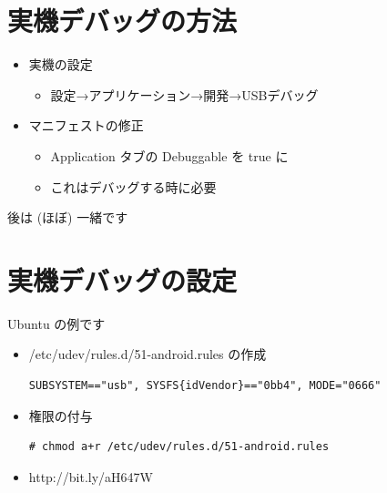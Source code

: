\documentclass[slide,papersize]{jsarticle}
\begin{document}
\section*{実機デバッグの方法}
\bigskip
\begin{itemize}
\item 実機の設定
 \begin{itemize}
 \item {\footnotesize 設定→アプリケーション→開発→USBデバッグ}
 \end{itemize}
\bigskip
\item マニフェストの修正
 \begin{itemize}
 \item {\footnotesize Application タブの Debuggable を true に}
 \item {\footnotesize これはデバッグする時に必要}
 \end{itemize}
\end{itemize}
後は (ほぼ) 一緒です

\section*{実機デバッグの設定}
\medskip
Ubuntu の例です
\begin{itemize}
\item /etc/udev/rules.d/51-android.rules の作成\\
{\tiny \begin{verbatim}SUBSYSTEM=="usb", SYSFS{idVendor}=="0bb4", MODE="0666"\end{verbatim}}
\item 権限の付与\\
{\tiny \begin{verbatim}# chmod a+r /etc/udev/rules.d/51-android.rules\end{verbatim}}
\bigskip
\item http://bit.ly/aH647W
\end{itemize}
\end{document}

